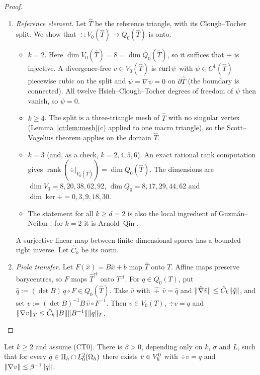 \begin{proof}
\begin{enumerate}
\item \emph{Reference element.} Let $\hat T$ be the reference triangle, with its Clough--Tocher split. We show that $\div:V_0(\hat T)\to Q_0(\hat T)$ is onto.
\begin{itemize}
\item $k=2$. Here $\dim V_0(\hat T)=8=\dim Q_0(\hat T)$, so it suffices that $\div$ is injective. A divergence-free $v\in V_0(\hat T)$ is $\operatorname{curl}\psi$ with $\psi\in C^1(\hat T)$ piecewise cubic on the split and $\psi=\nabla\psi=0$ on $\partial\hat T$ (the boundary is connected). All twelve Hsieh--Clough--Tocher degrees of freedom of $\psi$ \cite{CloughTocher1965,Ciarlet1978book} then vanish, so $\psi=0$.
\item $k\ge4$. The split is a three-triangle mesh of $\hat T$ with no singular vertex (Lemma~\ref{ct:lem:mesh}(c) applied to one macro triangle), so the Scott--Vogelius theorem \cite{ScottVogelius1985,GuzmanScott2019} applies on the domain $\hat T$.
\item $k=3$ (and, as a check, $k=2,4,5,6$). An exact rational rank computation gives $\operatorname{rank}(\div|_{V_0(\hat T)})=\dim Q_0(\hat T)$. The dimensions are $\dim V_0=8,20,38,62,92$, $\dim Q_0=8,17,29,44,62$ and $\dim\ker\div=0,3,9,18,30$.
\item The statement for all $k\ge d=2$ is also the local ingredient of Guzm\'an--Neilan \cite{GuzmanNeilan2018}; for $k=2$ it is Arnold--Qin \cite{ArnoldQin1992}.
\end{itemize}
A surjective linear map between finite-dimensional spaces has a bounded right inverse. Let $\hat C_k$ be its norm.
\item \emph{Piola transfer.} Let $F(\hat x)=B\hat x+b$ map $\hat T$ onto $T$. Affine maps preserve barycentres, so $F$ maps $\hat T^{\mathrm{ct}}$ onto $T^{\mathrm{ct}}$. For $q\in Q_0(T)$, put $\hat q:=(\det B)\,q\circ F\in Q_0(\hat T)$. Take $\hat v$ with $\widehat\div\,\hat v=\hat q$ and $\lVert \hat\nabla\hat v\rVert\le\hat C_k\lVert \hat q\rVert$, and set $v:=(\det B)^{-1}B\,\hat v\circ F^{-1}$. Then $v\in V_0(T)$, $\div v=q$ and $\lVert \nabla v\rVert_T\le\hat C_k\lVert B\rVert\lVert B^{-1}\rVert\lVert q\rVert_T$.\qedhere
\end{enumerate}
\end{proof}

\begin{lemma}\label{ct:lem:infsup}
Let $k\ge2$ and assume (CT0). There is $\beta>0$, depending only on $k$, $\sigma$ and $L$, such that for every $q\in\Pi_h\cap L^2_0(\Omega_h)$ there exists $v\in V_h^0$ with $\div v=q$ and $\lVert \nabla v\rVert\le\beta^{-1}\lVert q\rVert$.
\end{lemma}

